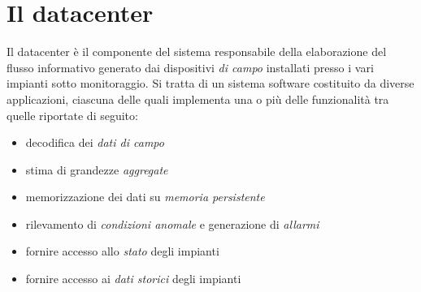 \clearpage{\pagestyle{empty}\cleardoublepage}
\chapter{Il datacenter}\label{sec:datacenter}
%
Il datacenter \`e il componente del sistema responsabile della elaborazione 
del flusso informativo generato dai dispositivi \emph{di campo} installati 
presso i vari impianti sotto monitoraggio.
%
Si tratta di un sistema software costituito da diverse applicazioni, ciascuna 
delle quali implementa una o pi\`u delle funzionalit\`a tra quelle riportate di seguito:
%
\begin{itemize}
  \item decodifica dei \emph{dati di campo}
  \item stima di grandezze \emph{aggregate}
  \item memorizzazione dei dati su \emph{memoria persistente}
  \item rilevamento di \emph{condizioni anomale} e generazione di \emph{allarmi}
  \item fornire accesso allo \emph{stato} degli impianti
  \item fornire accesso ai \emph{dati storici} degli impianti
\end{itemize}
%

